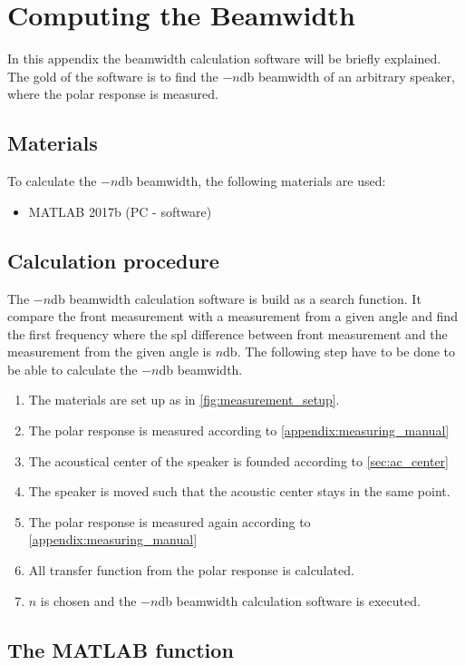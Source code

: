 \chapter{Computing the Beamwidth}\label{appendix:beamwidth}
In this appendix the beamwidth calculation software will be briefly explained. The gold of the software is to find the $-n$\si{\decibel} beamwidth of an arbitrary speaker, where the polar response is measured. 

\section*{Materials}
To calculate the $-n$\si{\decibel} beamwidth, the following materials are used:
\begin{itemize}
\item MATLAB 2017b (PC - software)
\end{itemize}


\section*{Calculation procedure}
The $-n$\si{\decibel} beamwidth calculation software is build as a search function. It compare the front measurement with a measurement from a given angle and find the first frequency where the \gls{spl} difference between front measurement and the measurement from the given angle is $n$\si{\decibel}. The following step have to be done to be able to calculate the $-n$\si{\decibel} beamwidth.

\begin{enumerate}
\item The materials are set up as in \autoref{fig:measurement_setup}.
\item The polar response is measured according to \autoref{appendix:measuring_manual}
\item The acoustical center of the speaker is founded according to \autoref{sec:ac_center}
\item  The speaker is moved such that the acoustic center stays in the same point. 
\item The polar response is measured again according to \autoref{appendix:measuring_manual}
\item All transfer function from the polar response is calculated.
\item $n$ is chosen and the  $-n$\si{\decibel} beamwidth calculation software is executed.
\end{enumerate}


\section*{The MATLAB function}
